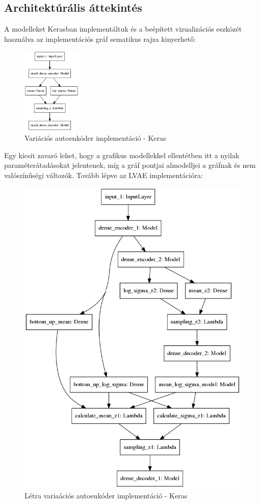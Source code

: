 \documentclass[12pt, english]{article}
\begin{document}
\subsection{Architektúrális áttekintés}

\vspace{5mm}

\par A modelleket Kerasban \cite{chollet2015keras} implementáltuk és a beépített vizualizációs eszközét használva az implementációs gráf sematikus rajza kinyerhető:

\vspace{4mm}

\begin{figure}[H]
    \centering
    \includegraphics[width=0.25\textwidth]{vae_keras.png}
    \caption{Variációs autoenkóder implementáció - Keras}
\end{figure}

\vspace{4mm}

\par Egy kicsit zavaró lehet, hogy a grafikus modellekkel ellentétben itt a nyilak paraméterátadásokat jelentenek, míg a gráf pontjai almodelljei a gráfnak és nem valószínűségi változók. Tovább lépve az LVAE implementációra:

\vspace{4mm}

\begin{figure}[H]
    \centering
    \includegraphics[width=0.6\linewidth]{dense_lvae_keras.png}
    \caption{Létra variaációs autoenkóder implementáció - Keras}
    \label{fig:keras_lvae}
\end{figure}
\end{document}
